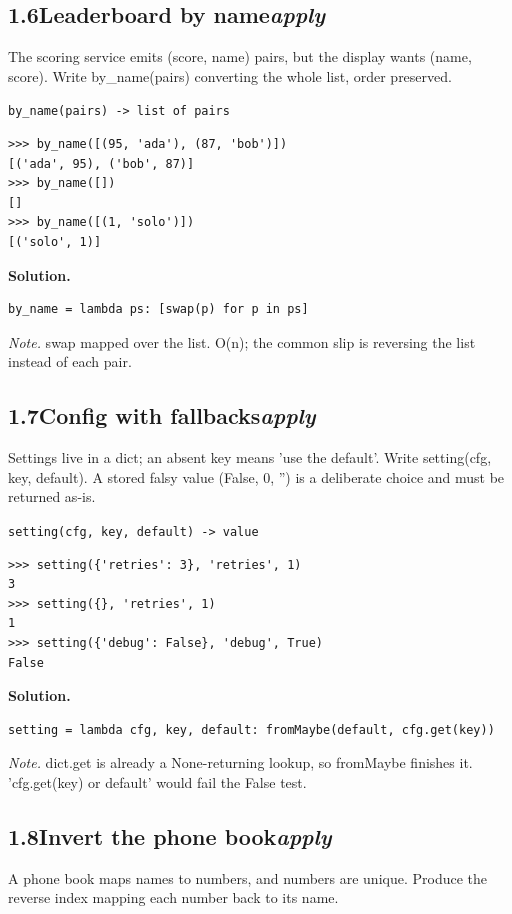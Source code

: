 \documentclass[10pt,letterpaper]{book}
\begin{document}

\subsection*{1.6\quad Leaderboard by name\hfill\textnormal{\textit{apply}}}
The scoring service emits (score, name) pairs, but the display wants (name, score). Write by\_name(pairs) converting the whole list, order preserved.

\noindent\texttt{by\_name(pairs) -> list of pairs}
\begin{lstlisting}[style=ex]
>>> by_name([(95, 'ada'), (87, 'bob')])
[('ada', 95), ('bob', 87)]
>>> by_name([])
[]
>>> by_name([(1, 'solo')])
[('solo', 1)]
\end{lstlisting}
\noindent\textbf{Solution.}
\begin{lstlisting}[style=code]
by_name = lambda ps: [swap(p) for p in ps]
\end{lstlisting}
\noindent\textit{Note.} swap mapped over the list. O(n); the common slip is reversing the list instead of each pair.

\subsection*{1.7\quad Config with fallbacks\hfill\textnormal{\textit{apply}}}
Settings live in a dict; an absent key means 'use the default'. Write setting(cfg, key, default). A stored falsy value (False, 0, '') is a deliberate choice and must be returned as-is.

\noindent\texttt{setting(cfg, key, default) -> value}
\begin{lstlisting}[style=ex]
>>> setting({'retries': 3}, 'retries', 1)
3
>>> setting({}, 'retries', 1)
1
>>> setting({'debug': False}, 'debug', True)
False
\end{lstlisting}
\noindent\textbf{Solution.}
\begin{lstlisting}[style=code]
setting = lambda cfg, key, default: fromMaybe(default, cfg.get(key))
\end{lstlisting}
\noindent\textit{Note.} dict.get is already a None-returning lookup, so fromMaybe finishes it. 'cfg.get(key) or default' would fail the False test.

\subsection*{1.8\quad Invert the phone book\hfill\textnormal{\textit{apply}}}
A phone book maps names to numbers, and numbers are unique. Produce the reverse index mapping each number back to its name.
\end{document}
